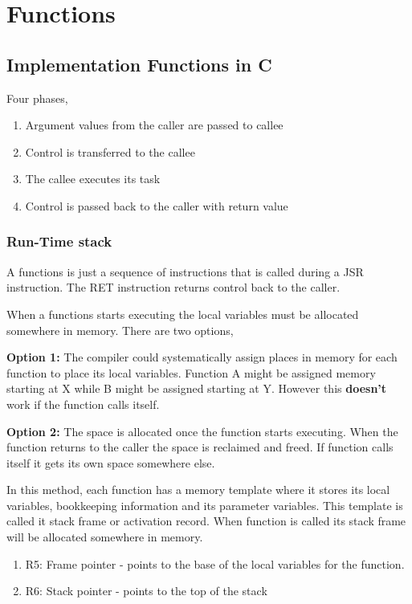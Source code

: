 \chapter{Functions}

\section{Implementation Functions in C}
Four phases,
\begin{enumerate}
    \item Argument values from the caller are passed to callee
    \item Control is transferred to the callee
    \item The callee executes its task
    \item Control is passed back to the caller with return value
\end{enumerate}

\subsection{Run-Time stack}
A functions is just a sequence of instructions that is called during a JSR instruction. The RET instruction returns control back to the caller. 

When a functions starts executing the local variables must be allocated somewhere in memory. There are two options,

\textbf{Option 1: }The compiler could systematically assign places in memory for each function to place its local variables. Function A might be assigned memory starting at X while B might be assigned starting at Y. However this \textbf{doesn't} work if the function calls itself.

\textbf{Option 2: }The space is allocated once the function starts executing. When the function returns to the caller the space is reclaimed and freed. If function calls itself it gets its own space somewhere else.

In this method, each function has a memory template where it stores its local variables, bookkeeping information and its parameter variables. This template is called it stack frame or activation record. When function is called its stack frame will be allocated somewhere in memory. 


\begin{enumerate}
    \item R5: Frame pointer - points to the base of the local variables for the function.
    \item R6: Stack pointer - points to the top of the stack
\end{enumerate}

